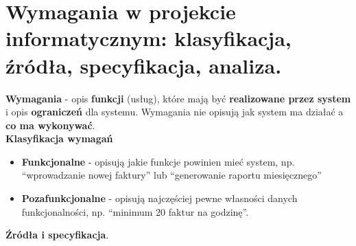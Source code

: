 \documentclass[main.tex]{subfiles}
\begin{document}
    \section{Wymagania w projekcie informatycznym: klasyfikacja, źródła, specyfikacja, analiza.}

    \textbf{Wymagania} - opis \textbf{funkcji} (usług), które mają być \textbf{realizowane przez system} i opis
    \textbf{ograniczeń} dla systemu. Wymagania nie opisują jak system ma działać a \textbf{co ma wykonywać}.\\

    \noindent \textbf{Klasyfikacja wymagań}
    \begin{itemize}
        \item \textbf{Funkcjonalne} - opisują jakie funkcje powinien mieć system, np. ``wprowadzanie nowej faktury''
        lub ``generowanie raportu miesięcznego''
        \item \textbf{Pozafunkcjonalne} - opisują najczęściej pewne własności danych funkcjonalności, np. ``minimum
        20 faktur na godzinę''.
    \end{itemize}

    \noindent \textbf{Źródła i specyfikacja}. %
\end{document}
